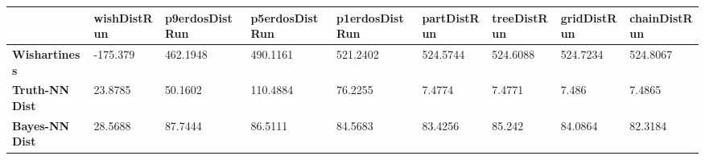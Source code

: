 \begin{tabular}{|l|l|l|l|l|l|l|l|l|}
\hline
&\textbf{wishDistRun}&\textbf{p9erdosDistRun}&\textbf{p5erdosDistRun}&\textbf{p1erdosDistRun}&\textbf{partDistRun}&\textbf{treeDistRun}&\textbf{gridDistRun}&\textbf{chainDistRun}\\\hline
\textbf{Wishartiness}&-175.379&462.1948&490.1161&521.2402&524.5744&524.6088&524.7234&524.8067\\\hline
\textbf{Truth-NN Dist}&23.8785&50.1602&110.4884&76.2255&7.4774&7.4771&7.486&7.4865\\\hline
\textbf{Bayes-NN Dist}&28.5688&87.7444&86.5111&84.5683&83.4256&85.242&84.0864&82.3184\\\hline
\end{tabular}
